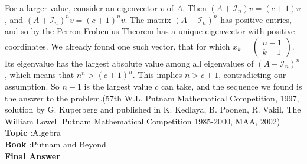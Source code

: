 \documentclass[10pt]{article}
\begin{document}
For a larger value, consider an eigenvector $v$ of $A$. Then $\left(A+\mathcal{I}_{n}\right) v=(c+1) v$, and $\left(A+\mathcal{I}_{n}\right)^{n} v=(c+1)^{n} v$. The matrix $\left(A+\mathcal{I}_{n}\right)^{n}$ has positive entries, and so by the Perron-Frobenius Theorem has a unique eigenvector with positive coordinates. We already found one such vector, that for which $x_{k}=\left(\begin{array}{c}n-1 \\ k-1\end{array}\right)$. Its eigenvalue has the largest absolute value among all eigenvalues of $\left(A+\mathcal{I}_{n}\right)^{n}$, which means that $n^{n}>(c+1)^{n}$. This implies $n>c+1$, contradicting our assumption. So $n-1$ is the largest value $c$ can take, and the sequence we found is the answer to the problem.(57th W.L. Putnam Mathematical Competition, 1997, solution by G. Kuperberg and published in K. Kedlaya, B. Poonen, R. Vakil, The William Lowell Putnam Mathematical Competition 1985-2000, MAA, 2002)\\
\textbf{Topic} :Algebra\\
\textbf{Book} :Putnam and Beyond\\
\textbf{Final Answer} :\\
\end{document}
